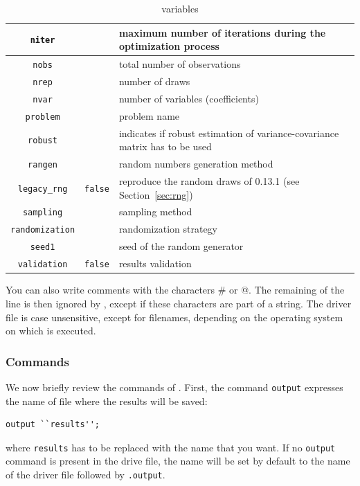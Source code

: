 \begin{table}[htbp]
\begin{small}
\begin{center}
\begin{tabular}{|c|c|p{6cm}|}
\hline
\verb|niter| & & maximum number of iterations during the optimization
process \\
\hline
\verb|nobs| & & total number of observations \\
\hline
\verb|nrep| & & number of draws \\
\hline
\verb|nvar| & & number of variables (coefficients) \\
\hline
\verb|problem| & & problem name \\
\hline
\verb|robust| & & indicates if robust estimation of variance-covariance
matrix has to be used \\
\hline
\verb|rangen| & & random numbers generation method \\
\hline
\verb|legacy_rng| & \verb|false| & reproduce the random draws of
\amlet{} 0.13.1 (see Section~\ref{sec:rng}) \\
\hline
\verb|sampling| & & sampling method \\
\hline
\verb|randomization| & & randomization strategy \\
\hline
\verb|seed1| & & seed of the random generator\\
\hline
\verb|validation| & \verb|false| & results validation \\
\hline
\end{tabular}
\caption{variables}
\label{tab:variables}
\end{center}
\end{small}
\end{table}

You can also write comments with the characters \# or \makeatletter
@\makeatother. The remaining of the line is then ignored by
\amlet{}, except if these characters are part of a string. The driver
file is case unsensitive, except for filenames, depending on the
operating system on which \amlet{} is executed.

\subsubsection{Commands}

We now briefly review the commands of \amlet{}. First, the command
\verb|output| expresses the name of file where the results will be saved:
\begin{verbatim}
output ``results'';
\end{verbatim}
where \verb|results| has to be replaced with the name that you want.
If no \verb|output| command is present in the drive file, the name
will be set by default to the name of the driver file followed by
\verb|.output|.

